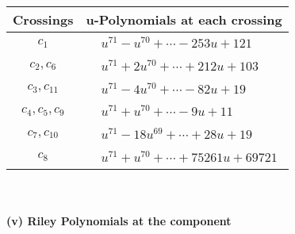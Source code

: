 \documentclass[1p]{elsarticle_modified}
\theoremstyle{definition}
\begin{document}
\begin{tabular}{m{50pt}|m{274pt}}
Crossings & \hspace{64pt}u-Polynomials at each crossing \\
\hline $$\begin{aligned}c_{1}\end{aligned}$$&$\begin{aligned}
&u^{71}- u^{70}+\cdots-253 u+121
\end{aligned}$\\
\hline $$\begin{aligned}c_{2},c_{6}\end{aligned}$$&$\begin{aligned}
&u^{71}+2 u^{70}+\cdots+212 u+103
\end{aligned}$\\
\hline $$\begin{aligned}c_{3},c_{11}\end{aligned}$$&$\begin{aligned}
&u^{71}-4 u^{70}+\cdots-82 u+19
\end{aligned}$\\
\hline $$\begin{aligned}c_{4},c_{5},c_{9}\end{aligned}$$&$\begin{aligned}
&u^{71}+u^{70}+\cdots-9 u+11
\end{aligned}$\\
\hline $$\begin{aligned}c_{7},c_{10}\end{aligned}$$&$\begin{aligned}
&u^{71}-18 u^{69}+\cdots+28 u+19
\end{aligned}$\\
\hline $$\begin{aligned}c_{8}\end{aligned}$$&$\begin{aligned}
&u^{71}+u^{70}+\cdots+75261 u+69721
\end{aligned}$\\
\hline
\end{tabular}\\~\\
\newpage\renewcommand{\arraystretch}{1}
\flushleft \textbf{(v) Riley Polynomials at the component}\newline \\
\end{document}
